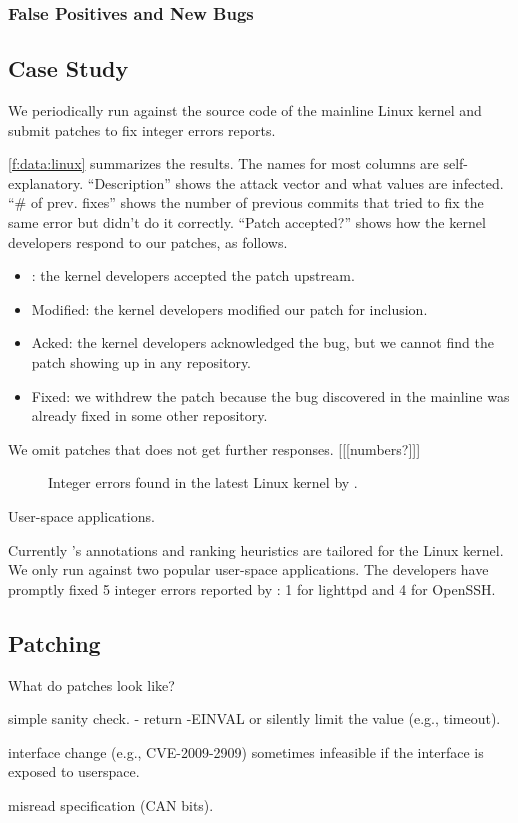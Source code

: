 \subsubsection{False Positives and New Bugs}


\subsection{Case Study}

We periodically run \sys against the source code of the mainline
Linux kernel and submit patches to fix integer errors \sys reports.

\autoref{f:data:linux} summarizes the results.  The names for most
columns are self-explanatory.  ``Description'' shows the attack
vector and what values are infected.  ``\# of prev. fixes'' shows
the number of previous commits that tried to fix the same error but
didn't do it correctly.  ``Patch accepted?'' shows how the kernel
developers respond to our patches, as follows.
\begin{itemize}
\item
\ok: the kernel developers accepted the patch upstream.
\item
Modified: the kernel developers modified our patch for inclusion.
\item
Acked: the kernel developers acknowledged the bug,
but we cannot find the patch showing up in any repository.
\item
Fixed: we withdrew the patch because the bug discovered in the
mainline was already fixed in some other repository.
\end{itemize}
We omit patches that does not get further responses. [[[numbers?]]]

\begin{figure*}
\centering
\footnotesize

\caption{Integer errors found in the latest Linux kernel by \sys.}
\label{f:data:linux}
\end{figure*}

User-space applications.

Currently \sys's annotations and ranking heuristics are tailored
for the Linux kernel.  We only run \sys against two popular user-space
applications.  The developers have promptly fixed 5 integer errors
reported by \sys: 1 for lighttpd and 4 for OpenSSH.

\subsection{Patching}

What do patches look like?

simple sanity check.
- return -EINVAL or silently limit the value (e.g., timeout).

interface change (e.g., CVE-2009-2909)
sometimes infeasible if the interface is exposed to userspace.

misread specification (CAN bits).
